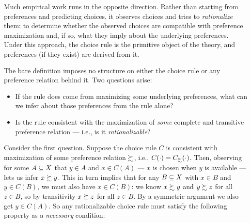 Much empirical work runs in the opposite direction. Rather than starting
from preferences and predicting choices, it observes choices and tries
to \emph{rationalize} them: to determine whether the observed choices
are compatible with preference maximization and, if so, what they imply
about the underlying preferences. Under this approach, the choice rule
is the primitive object of the theory, and preferences (if they exist)
are derived from it.



The bare definition imposes no structure on either the choice rule or
any preference relation behind it. Two questions arise:

\begin{itemize}
\item
  If the rule does come from maximizing some underlying preferences,
  what can we infer about those preferences from the rule alone?
\item
  Is the rule consistent with the maximization of \emph{some} complete
  and transitive preference relation — i.e., is it
  \emph{rationalizable}?
\end{itemize}

Consider the first question. Suppose the choice rule \(C\) is consistent
with maximization of some preference relation \(\succsim\), i.e.,
\(C(\cdot) = C_\succsim(\cdot)\). Then, observing for some \(A\subseteq X\) that
\(y\in A\) and \(x\in C(A)\) — \(x\) is chosen when \(y\) is available
— lets us infer \(x\succsim y\). This in turn implies that for any
\(B\subseteq X\) with \(x\in B\) and \(y\in C(B)\), we must also have
\(x\in C(B)\): we know \(x\succsim y\) and \(y\succsim z\) for all
\(z\in B\), so by transitivity \(x\succsim z\) for all \(z\in B\). By a
symmetric argument we also get \(y\in C(A)\). So any rationalizable
choice rule must satisfy the following property as a \textit{necessary}
condition:

